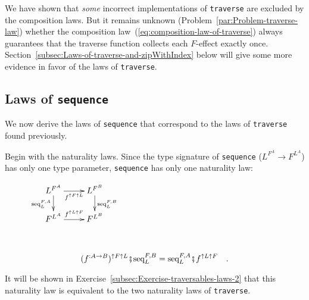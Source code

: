 We have shown that \emph{some} incorrect implementations of \lstinline!traverse!
are excluded by the composition laws. But it remains unknown (Problem~\ref{par:Problem-traverse-law})
whether the composition law~(\ref{eq:composition-law-of-traverse})
always guarantees that the traverse function collects each $F$-effect
exactly once. Section~\ref{subsec:Laws-of-traverse-and-zipWithIndex}
below will give some more evidence in favor of the laws of \lstinline!traverse!.

\subsection{Laws of \texttt{sequence}}

We now derive the laws of \lstinline!sequence! that correspond to
the laws of \lstinline!traverse! found previously. 

Begin with the naturality laws. Since the type signature of \lstinline!sequence!
($L^{F^{A}}\rightarrow F^{L^{A}}$) has only one type parameter, \lstinline!sequence!
has only one naturality law:%
\begin{comment}
precarious formatting
\end{comment}

\begin{wrapfigure}{i}{0.22\columnwidth}%
\vspace{-1.3\baselineskip}
$\xymatrix{\xyScaleY{1.5pc}\xyScaleX{2.0pc}L^{F^{A}}\ar[d]\sb(0.45){\text{seq}_{L}^{F,A}}\ar[r]\sb(0.5){f^{\uparrow F\uparrow L}} & L^{F^{B}}\ar[d]\sp(0.45){\text{seq}_{L}^{F,B}}\\
F^{L^{A}}\ar[r]\sp(0.5){f^{\uparrow L\uparrow F}} & F^{L^{B}}
}
$\vspace{1.5\baselineskip}
\end{wrapfigure}%

~\vspace{-1.4\baselineskip}

\begin{equation}
(f^{:A\rightarrow B})^{\uparrow F\uparrow L}\bef\text{seq}_{L}^{F,B}=\text{seq}_{L}^{F,A}\bef f^{\uparrow L\uparrow F}\quad.\label{eq:sequence-naturality-law}
\end{equation}

\noindent It will be shown in Exercise~\ref{subsec:Exercise-traversables-laws-2}
that this naturality law is equivalent to the two naturality laws
of \lstinline!traverse!.

